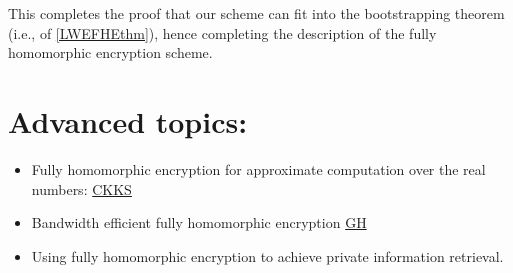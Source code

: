 This completes the proof that our scheme can fit into the bootstrapping
theorem (i.e., of \cref{LWEFHEthm}), hence completing the description of
the fully homomorphic encryption scheme.


\section{Advanced topics:}\label{Advanced-topics}

\begin{itemize}
\item
  Fully homomorphic encryption for approximate computation over the real
  numbers: \href{https://eprint.iacr.org/2016/421.pdf}{CKKS}
\item
  Bandwidth efficient fully homomorphic encryption
  \href{https://eprint.iacr.org/2019/733.pdf}{GH}
\item
  Using fully homomorphic encryption to achieve private information
  retrieval.
\end{itemize}
